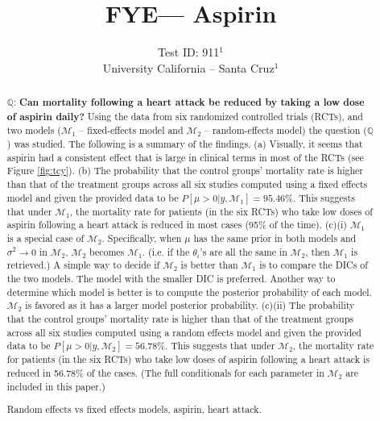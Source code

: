 \documentclass{../../tex_template/asaproc}
\title{FYE--- Aspirin}
\author{
  Test ID: 911$^1$\\
  University California -- Santa Cruz$^1$\\
}
\newcommand{\bk}[1]{\left[#1\right]}
\newcommand{\M}{\mathcal{M}}
\newcommand{\Q}{\mathbb{Q}}
\begin{document}
\maketitle
\begin{abstract}
$\Q$: \textbf{Can mortality following a heart attack be reduced by taking a low
dose of aspirin daily?} Using the data from six randomized controlled trials
(RCTs), and two models ($\M_1$ -- fixed-effects model and $\M_2$ --
random-effects model) the question ($\Q$) was studied. The following is a
summary of the findings. (a) Visually, it seems that aspirin had a consistent
effect that is large in clinical terms in most of the RCTs (see Figure
\ref{fig:tcy}).  (b) The probability that the control groups' mortality rate is
higher than that of the treatment groups across all six studies computed using
a fixed effects model and given the provided data to be $P\bk{\mu > 0 | y, \M_1} =
95.46\%$. This suggests that under $\M_1$, the mortality rate for patients (in
the six RCTs) who take low doses of aspirin following a heart attack is reduced
in most cases (95\% of the time). (c)(i) $\M_1$ is a special case of $\M_2$.
Specifically, when $\mu$ has the same prior in both models and $\sigma^2
\rightarrow 0$ in $\M_2$, $\M_2$ becomes $\M_1$. (i.e. if the $\theta_i$'s are
all the same in $\M_2$, then $\M_1$ is retrieved.) A simple way to decide if
$\M_2$ is better than $\M_1$ is to compare the DICs of the two models. The
model with the smaller DIC is preferred. Another way to determine which model
is better is to compute the posterior probability of each model.  $\M_2$ is
favored as it has a larger model posterior probability. (c)(ii) The probability
that the control groups' mortality rate is higher than that of the treatment
groups across all six studies computed using a random effects model and given
the provided data to be $P\bk{\mu > 0 | y, \M_2} = 56.78\%$. This suggests that
under $\M_2$, the mortality rate for patients (in the six RCTs) who take low
doses of aspirin following a heart attack is reduced in 56.78\% of the cases.
(The full conditionals for each parameter in $\M_2$ are included in this
paper.)

\begin{keywords}
Random effects vs fixed effects models, aspirin, heart attack.
\end{keywords}
\end{abstract}
\end{document}
